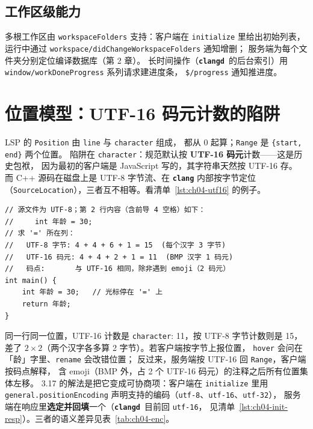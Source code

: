\documentclass[12pt,a4paper,fontset=fandol]{ctexbook}
\newcommand{\Bk}{\discretionary{}{}{}}
\newcommand{\Lib}[1]{\textbf{\texttt{#1}}}
\newcommand{\Lang}[1]{\textsf{#1}}
\newcommand{\CPP}{\Lang{C++}}
\newcommand{\CD}{\Lib{clangd}}
\begin{document}
\subsection{工作区级能力}
多根工作区由 \texttt{workspaceFolders} 支持：客户端在
\texttt{initialize} 里给出初始列表，运行中通过
\texttt{workspace/}\Bk\texttt{didChangeWorkspaceFolders} 通知增删；
服务端为每个文件夹分别定位编译数据库（第 2 章）。
长时间操作（\CD\ 的后台索引）用
\texttt{window/}\Bk\texttt{workDoneProgress} 系列请求建进度条，
\texttt{\$/progress} 通知推进度。

\section{位置模型：UTF-16 码元计数的陷阱}\label{sec:ch04-s5}

LSP 的 \texttt{Position} 由 \texttt{line} 与 \texttt{character} 组成，
都从 0 起算；\texttt{Range} 是 \texttt{\{start, end\}} 两个位置。
陷阱在 \texttt{character}：规范默认按 \textbf{UTF-16 码元}计数——这是历史包袱，
因为最初的客户端是 JavaScript 写的，其字符串天然按 UTF-16 存。
而 \CPP{} 源码在磁盘上是 UTF-8 字节流、在 \Lib{clang} 内部按字节定位
（\texttt{SourceLocation}），三者互不相等。看清单~\ref{lst:ch04-utf16} 的例子。

\begin{lstlisting}[style=cppstyle,caption={含中文的行里，三种计数法给出的列号各不相同},label={lst:ch04-utf16}]
// 源文件为 UTF-8；第 2 行内容（含前导 4 空格）如下：
//     int 年龄 = 30;
// 求 '=' 所在列：
//   UTF-8 字节: 4 + 4 + 6 + 1 = 15  (每个汉字 3 字节)
//   UTF-16 码元: 4 + 4 + 2 + 1 = 11  (BMP 汉字 1 码元)
//   码点:       与 UTF-16 相同，除非遇到 emoji（2 码元）
int main() {
    int 年龄 = 30;   // 光标停在 '=' 上
    return 年龄;
}
\end{lstlisting}

同一行同一位置，UTF-16 计数是 \texttt{character}: 11，按 UTF-8 字节计数则是 15，
差了 $2\times2$（两个汉字各多算 2 字节）。若客户端按字节上报位置，
\texttt{hover} 会问在「龄」字里、\texttt{rename} 会改错位置；
反过来，服务端按 UTF-16 回 \texttt{Range}，客户端按码点解释，
含 emoji（BMP 外，占 2 个 UTF-16 码元）的注释之后所有位置集体左移。
3.17 的解法是把它变成可协商项：客户端在
\texttt{initialize} 里用 \texttt{general.positionEncoding}
声明支持的编码（\texttt{utf-8}、\texttt{utf-16}、\texttt{utf-32}），
服务端在响应里\textbf{选定并回填}一个（\CD\ 目前回 \texttt{utf-16}，
见清单~\ref{lst:ch04-init-resp}）。三者的语义差异见表~\ref{tab:ch04-enc}。
\end{document}
